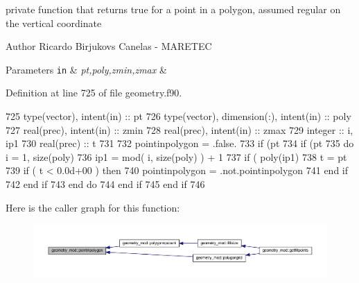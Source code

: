 private function that returns true for a point in a polygon, assumed regular on the vertical coordinate 

\begin{DoxyAuthor}{Author}
Ricardo Birjukovs Canelas -\/ M\+A\+R\+E\+T\+EC 
\end{DoxyAuthor}

\begin{DoxyParams}[1]{Parameters}
\mbox{\tt in}  & {\em pt,poly,zmin,zmax} & \\
\hline
\end{DoxyParams}


Definition at line 725 of file geometry.\+f90.


\begin{DoxyCode}
725     \textcolor{keywordtype}{type}(vector), \textcolor{keywordtype}{intent(in)} :: pt
726     \textcolor{keywordtype}{type}(vector), \textcolor{keywordtype}{dimension(:)}, \textcolor{keywordtype}{intent(in)} :: poly
727     \textcolor{keywordtype}{real(prec)}, \textcolor{keywordtype}{intent(in)} :: zmin
728     \textcolor{keywordtype}{real(prec)}, \textcolor{keywordtype}{intent(in)} :: zmax
729     \textcolor{keywordtype}{integer} :: i, ip1
730     \textcolor{keywordtype}{real(prec)} :: t
731 
732     pointinpolygon = .false.
733     \textcolor{keywordflow}{if} (pt%
734         \textcolor{keywordflow}{if} (pt%
735             \textcolor{keywordflow}{do} i = 1, \textcolor{keyword}{size}(poly)
736                 ip1 = mod( i, \textcolor{keyword}{size}(poly) ) + 1
737                 \textcolor{keywordflow}{if} ( poly(ip1)%
738                     t = pt%
739                     \textcolor{keywordflow}{if} ( t < 0.0d+00 ) \textcolor{keywordflow}{then}
740                         pointinpolygon = .not.pointinpolygon
741 \textcolor{keywordflow}{                    end if}
742 \textcolor{keywordflow}{                end if}
743 \textcolor{keywordflow}{            end do}
744 \textcolor{keywordflow}{        end if}
745 \textcolor{keywordflow}{    end if}
746 
\end{DoxyCode}
Here is the caller graph for this function\+:\nopagebreak
\begin{figure}[H]
\begin{center}
\leavevmode
\includegraphics[width=350pt]{namespacegeometry__mod_a51bc27aa95191008da7496c7b67b1bf4_icgraph}
\end{center}
\end{figure}
\mbox{\label{namespacegeometry__mod_a4862bb9e5bbc62fd581a34c4249b84d1}} 
